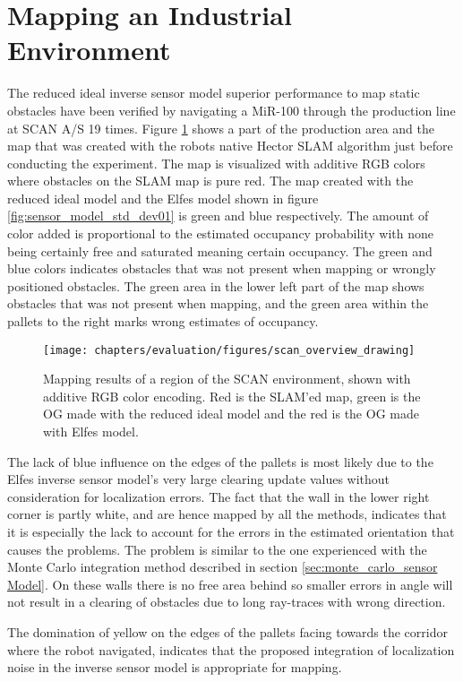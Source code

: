 \section{Mapping an Industrial Environment}
\label{sec:mapping_at_scan}
The reduced ideal inverse sensor model superior performance to map static obstacles have been verified by navigating a MiR-100 through the production line at SCAN A/S 19 times.
Figure \ref{fig:scan_overview_drawing} shows a part of the production area and the map that was created with the robots native Hector SLAM algorithm just before conducting the experiment.
The map is visualized with additive RGB colors where obstacles on the SLAM map is pure red. 
The map created with the reduced ideal model and the Elfes model shown in figure \ref{fig:sensor_model_std_dev01} is green and blue respectively.
The amount of color added is proportional to the estimated occupancy probability with none being certainly free and saturated meaning certain occupancy. 
The green and blue colors indicates obstacles that was not present when mapping or wrongly positioned obstacles.
The green area in the lower left part of the map shows obstacles that was not present when mapping, and the green area within the pallets to the right marks wrong estimates of occupancy.

\begin{figure}
    \centering
    \texttt{[image: chapters/evaluation/figures/scan\_overview\_drawing]}
    \caption{Mapping results of a region of the SCAN environment, shown with additive RGB color encoding. Red is the SLAM'ed map, green is the OG made with the reduced ideal model and the red is the OG made with Elfes model.}
    \label{fig:scan_overview_drawing}
\end{figure}

The lack of blue influence on the edges of the pallets is most likely due to the Elfes inverse sensor model's very large clearing update values without consideration for localization errors.
The fact that the wall in the lower right corner is partly white, and are hence mapped by all the methods, indicates that it is especially the lack to account for the errors in the estimated orientation that causes the problems. 
The problem is similar to the one experienced with the Monte Carlo integration method described in section \ref{sec:monte_carlo_sensor Model}.
On these walls there is no free area behind so smaller errors in angle will not result in a clearing of obstacles due to long ray-traces with wrong direction.

The domination of yellow on the edges of the pallets facing towards the corridor where the robot navigated, indicates that the proposed integration of localization noise in the inverse sensor model is appropriate for mapping. 